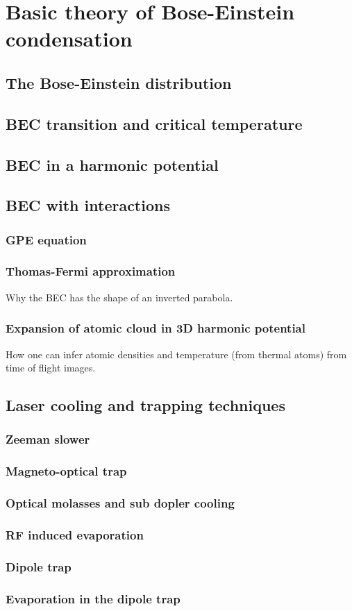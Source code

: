 
\renewcommand{\thechapter}{2}

\chapter{Basic theory of Bose-Einstein condensation}

\section{The Bose-Einstein distribution}
\section{BEC transition and critical temperature}
\section{BEC in a harmonic potential}
\section{BEC with interactions}
\subsection{GPE equation}
\subsection{Thomas-Fermi approximation}
Why the BEC has the shape of an inverted parabola. 
\subsection{Expansion of atomic cloud in 3D harmonic potential}
How one can infer atomic densities and temperature (from thermal atoms) from time of flight images.

\section{Laser cooling and trapping techniques}

\subsection{Zeeman slower}
\subsection{Magneto-optical trap}
\subsection{Optical molasses and sub dopler cooling}
\subsection{RF induced evaporation}
\subsection{Dipole trap}
\subsection{Evaporation in the dipole trap}




